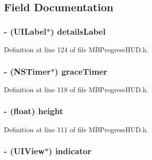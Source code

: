 \subsection{Field Documentation}
\hypertarget{interface_m_b_progress_h_u_d_a077099bddd69564b35222123f4c42f33}{
\subsubsection[{detailsLabel}]{\setlength{\rightskip}{0pt plus 5cm}-\/ (UILabel$\ast$) {\bf detailsLabel}}}
\label{interface_m_b_progress_h_u_d_a077099bddd69564b35222123f4c42f33}


Definition at line 124 of file MBProgressHUD.h.

\hypertarget{interface_m_b_progress_h_u_d_ab4b1d4d09e833eabdb13dc83f73da1d8}{
\subsubsection[{graceTimer}]{\setlength{\rightskip}{0pt plus 5cm}-\/ (NSTimer$\ast$) {\bf graceTimer}}}
\label{interface_m_b_progress_h_u_d_ab4b1d4d09e833eabdb13dc83f73da1d8}


Definition at line 118 of file MBProgressHUD.h.

\hypertarget{interface_m_b_progress_h_u_d_a48083b65ac9a863566dc3e3fff09a5b4}{
\subsubsection[{height}]{\setlength{\rightskip}{0pt plus 5cm}-\/ (float) {\bf height}}}
\label{interface_m_b_progress_h_u_d_a48083b65ac9a863566dc3e3fff09a5b4}


Definition at line 111 of file MBProgressHUD.h.

\hypertarget{interface_m_b_progress_h_u_d_abd7020204dc7ede51b3e46958c313422}{
\subsubsection[{indicator}]{\setlength{\rightskip}{0pt plus 5cm}-\/ (UIView$\ast$) {\bf indicator}}}
\label{interface_m_b_progress_h_u_d_abd7020204dc7ede51b3e46958c313422}


